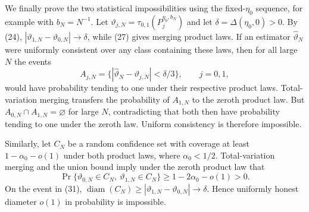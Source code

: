 We finally prove the two statistical impossibilities using the fixed-\(\eta_0\) sequence, for example with \(b_N=N^{-1}\). Let \(\vartheta_{j,N}=\tau_{0,1}(P_j^{\eta_0,b_N})\) and let \(\delta=\Delta(\eta_0,0)>0\). By (24), \(|\vartheta_{1,N}-\vartheta_{0,N}|\to\delta\), while (27) gives merging product laws. If an estimator \(\widehat\vartheta_N\) were uniformly consistent over any class containing these laws, then for all large \(N\) the events
\[
 A_{j,N}=\{|\widehat\vartheta_N-\vartheta_{j,N}|<\delta/3\},
 \qquad j=0,1,                                                 \tag{30}
\]
would have probability tending to one under their respective product laws. Total-variation merging transfers the probability of \(A_{1,N}\) to the zeroth product law. But \(A_{0,N}\cap A_{1,N}=\varnothing\) for large \(N\), contradicting that both then have probability tending to one under the zeroth law. Uniform consistency is therefore impossible.

Similarly, let \(C_N\) be a random confidence set with coverage at least \(1-\alpha_0-o(1)\) under both product laws, where \(\alpha_0<1/2\). Total-variation merging and the union bound imply under the zeroth product law that
\[
 \Pr\{\vartheta_{0,N}\in C_N,\ \vartheta_{1,N}\in C_N\}
 \ge1-2\alpha_0-o(1)>0.                                      \tag{31}
\]
On the event in (31), \(\operatorname{diam}(C_N)\ge|\vartheta_{1,N}-\vartheta_{0,N}|\to\delta\). Hence uniformly honest diameter \(o(1)\) in probability is impossible.

